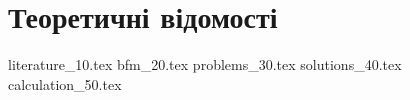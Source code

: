 \chapter{Теоретичні відомості}
{literature_10.tex}
{bfm_20.tex}
{problems_30.tex}
{solutions_40.tex}
{calculation_50.tex}
